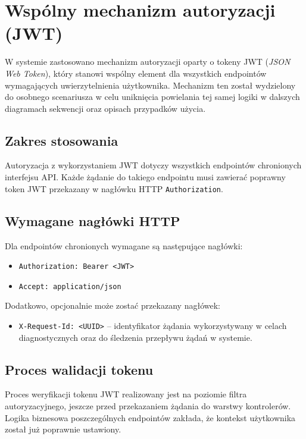 \documentclass[11pt, a4paper]{article}
\begin{document}
\section{Wspólny mechanizm autoryzacji (JWT)}

W systemie zastosowano mechanizm autoryzacji oparty o tokeny JWT
(\textit{JSON Web Token}), który stanowi wspólny element dla wszystkich
endpointów wymagających uwierzytelnienia użytkownika.
Mechanizm ten został wydzielony do osobnego scenariusza w celu uniknięcia
powielania tej samej logiki w dalszych diagramach sekwencji oraz opisach
przypadków użycia.

\subsection{Zakres stosowania}

Autoryzacja z wykorzystaniem JWT dotyczy wszystkich endpointów chronionych
interfejsu API. Każde żądanie do takiego endpointu musi zawierać poprawny token
JWT przekazany w nagłówku HTTP \texttt{Authorization}.

\subsection{Wymagane nagłówki HTTP}

Dla endpointów chronionych wymagane są następujące nagłówki:

\begin{itemize}
    \item \texttt{Authorization: Bearer <JWT>}
    \item \texttt{Accept: application/json}
\end{itemize}

Dodatkowo, opcjonalnie może zostać przekazany nagłówek:

\begin{itemize}
    \item \texttt{X-Request-Id: <UUID>} – identyfikator żądania wykorzystywany
    w celach diagnostycznych oraz do śledzenia przepływu żądań w systemie.
\end{itemize}

\subsection{Proces walidacji tokenu}

Proces weryfikacji tokenu JWT realizowany jest na poziomie filtra
autoryzacyjnego, jeszcze przed przekazaniem żądania do warstwy kontrolerów.
Logika biznesowa poszczególnych endpointów zakłada, że kontekst użytkownika
został już poprawnie ustawiony.
\end{document}
